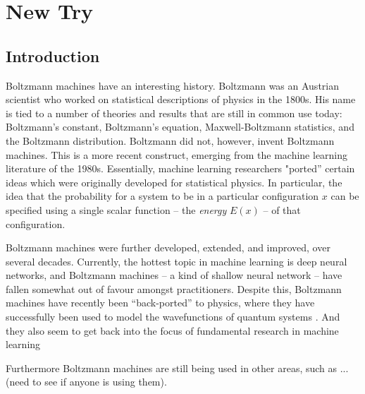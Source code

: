 \documentclass[nofootinbib, superscriptaddress, prl]{revtex4}
\begin{document}
\section{New Try}

\subsection{Introduction}

Boltzmann machines have an interesting history. Boltzmann was an Austrian scientist who worked on statistical descriptions of physics in the 1800s. His name is tied to a number of theories and results that are still in common use today: Boltzmann's constant, Boltzmann's equation, Maxwell-Boltzmann statistics, and the Boltzmann distribution. Boltzmann did not, however, invent Boltzmann machines. This is a more recent construct, emerging from the machine learning literature of the 1980s. Essentially, machine learning researchers "ported'' certain ideas which were originally developed for statistical physics. In particular, the idea that the probability for a system to be in a particular configuration $x$ can be specified using a single scalar function -- the \emph{energy} $E(x)$ -- of that configuration. 

Boltzmann machines were further developed, extended, and improved, over several decades. Currently, the hottest topic in machine learning is deep neural networks, and Boltzmann machines -- a kind of shallow neural network -- have fallen somewhat out of favour amongst practitioners. Despite this, Boltzmann machines have recently been ``back-ported'' to physics, where they have successfully been used to model the wavefunctions of quantum systems \cite{carleo2017solving}. And they also seem to get back into the focus of fundamental research in machine learning 

\noindent{}

Furthermore Boltzmann machines are still being used in other areas, such as ... (need to see if anyone is using them).
\end{document}
